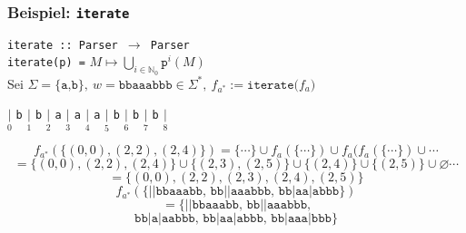 \documentclass{beamer}
\begin{document}
    \begin{frame}[t]
        \frametitle{\textbf{Beispiel:} \texttt{iterate}}
        \texttt{iterate ::\ Parser $\to$ Parser}\\
        \texttt{iterate(p) =} $\displaystyle M \mapsto \bigcup_{i \in \mathbb{N}_0} \texttt{p}^i(M)$\\
        Sei $\Sigma = \{\texttt{a,b}\},\ w = \texttt{bbaaabbb} \in \Sigma^*,\ f_{a^*} := \texttt{iterate($f_a$)}$\\
        \begin{center}
            $\underset{0}{|}$
                {\Large\texttt{b}}
            $\underset{1}{|}$
                {\Large\texttt{b}}
            $\underset{2}{|}$
                {\Large\texttt{a}}
            $\underset{3}{|}$
                {\Large\texttt{a}}
            $\underset{4}{|}$
                {\Large\texttt{a}}
            $\underset{5}{|}$
                {\Large\texttt{b}}
            $\underset{6}{|}$
                {\Large\texttt{b}}
            $\underset{7}{|}$
                {\Large\texttt{b}}
            $\underset{8}{|}$
        \end{center}
        \pause
        $$
            f_{a^*}(\{(0,0), (2,2), (2,4)\})
            = \{\cdots\} \cup f_a(\{\cdots\}) \cup f_a(f_a(\{\cdots\}) \cup \cdots
        $$$$
            = \{(0,0),(2,2),(2,4)\} \cup \{(2,3),(2,5)\} \cup \{(2,4)\} \cup \{(2,5)\} \cup \varnothing \cdots
        $$$$
            = \{(0,0),(2,2),(2,3),(2,4),(2,5)\}
        $$
        \pause
        $$
            f_{a^*}(\{\texttt{||bbaaabb, bb||aaabbb, bb|aa|abbb}\})
        $$$$
            = \{\texttt{||bbaaabb, bb||aaabbb,}
        $$$$
            \texttt{bb|a|aabbb, bb|aa|abbb, bb|aaa|bbb}\}
        $$
    \end{frame}

\end{document}
